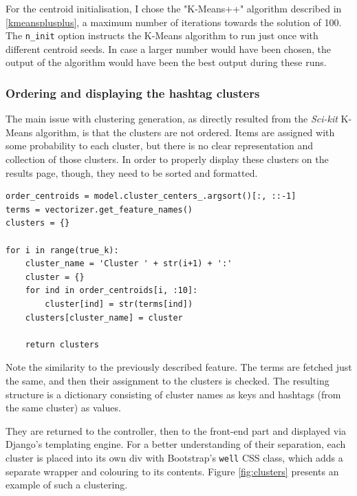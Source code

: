 For the centroid initialisation, I chose the "K-Means++" algorithm described in \ref{kmeansplusplus}, a maximum number of iterations towards the solution of 100. The \texttt{n\_init} option instructs the K-Means algorithm to run  just once with different centroid seeds. In case a larger number would have been chosen, the output of the algorithm would have been the best output during these runs.

\subsubsection{Ordering and displaying the hashtag clusters}
The main issue with clustering generation, as directly resulted from the \emph{Sci-kit} K-Means algorithm, is that the clusters are not ordered. Items are assigned with some probability to each cluster, but there is no clear representation and collection of those clusters. In order to properly display these clusters on the results page, though, they need to be sorted and formatted.

\lstset{basicstyle=\small, breaklines=True}
\begin{lstlisting}
order_centroids = model.cluster_centers_.argsort()[:, ::-1]
terms = vectorizer.get_feature_names()
clusters = {}

for i in range(true_k):
    cluster_name = 'Cluster ' + str(i+1) + ':'
    cluster = {}
    for ind in order_centroids[i, :10]:
        cluster[ind] = str(terms[ind])
    clusters[cluster_name] = cluster

    return clusters
\end{lstlisting}

Note the similarity to the previously described feature. The terms are fetched just the same, and then their assignment to the clusters is checked. The resulting structure is a dictionary consisting of cluster names as keys and hashtags (from the same cluster) as values.

They are returned to the controller, then to the front-end part and displayed via Django's templating engine. For a better understanding of their separation, each cluster is placed into its own div with Bootstrap's \texttt{well} CSS class, which adds a separate wrapper and colouring to its contents. Figure \ref{fig:clusters} presents an example of such a clustering.

